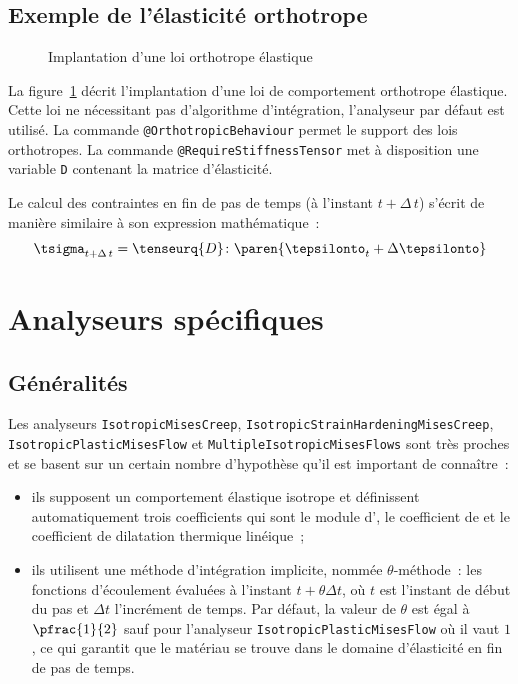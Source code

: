 \documentclass[rectoverso,pleiades,pstricks,leqno,anti]{texmf/note_technique_2010}
\newcommand{\code}[1]{
  \psframebox[linecolor=ceaorange,shadow=true,blur=true]{
    \begin{minipage}[htbp]{1.0\linewidth}
      \ttfamily\scriptsize #1
    \end{minipage}
  }
}
\begin{document}
\subsection{Exemple de l'élasticité orthotrope}

\begin{figure}[htbp]
  \centering
  \begin{minipage}[htbp]{0.9\linewidth}
    \shorthandoff{:}
    \code{
      \small
      
    }
    \shorthandon{:}
  \end{minipage}
  \caption{Implantation d'une loi orthotrope élastique}
  \label{fig:OrthoElastique}
\end{figure}

La figure~\ref{fig:OrthoElastique} décrit l'implantation d'une loi de
comportement orthotrope élastique. Cette loi ne nécessitant pas
d'algorithme d'intégration, l'analyseur par défaut est utilisé. La
commande \texttt{@Orthotropic\-Behaviour} permet le support des lois
orthotropes. La commande \texttt{@Require\-Stiff\-ness\-Tensor} met à
disposition une variable {\tt D} contenant la matrice d'élasticité.

Le calcul des contraintes en fin de pas de temps (à l'instant
\(t+\Delta\,t\)) s'écrit de manière similaire à son expression
mathématique~:
\[
\tsigma_{t+\Delta\,t} = \tenseurq{D}\colon\paren{\tepsilonto_{t}+\Delta\tepsilonto}
\]

\newpage
\clearpage
\section{Analyseurs spécifiques}

\subsection{Généralités}

Les analyseurs \texttt{Isotropic\-Mises\-Creep},
\texttt{Isotropic\-Strain\-Hardening\-Mises\-Creep},
\texttt{Isotropic\-Plastic\-Mises\-Flow} et
\texttt{Multiple\-Isotropic\-Mises\-Flows} sont très proches et se
basent sur un certain nombre d'hypothèse qu'il est important de
connaître~:
\begin{itemize}
  \item ils supposent un comportement élastique isotrope et définissent
  automatiquement trois coefficients qui sont le module d',
  le coefficient de  et le coefficient de dilatation
  thermique linéique~;
  \item ils utilisent une méthode d'intégration implicite, nommée
  \(\theta\)-méthode~: les fonctions d'écoulement évaluées à l'instant
  \(t+\theta\Delta t\), où \(t\) est l'instant de début du pas et
  \(\Delta t\) l'incrément de temps. Par défaut, la valeur de \(\theta\)
  est égal à \(\pfrac{1}{2}\) sauf pour l'analyseur
  \texttt{Isotropic\-Plastic\-Mises\-Flow} où il vaut \(1\), ce qui
  garantit que le matériau se trouve dans le domaine d'élasticité en fin
  de pas de temps.
\end{itemize}
\end{document}
